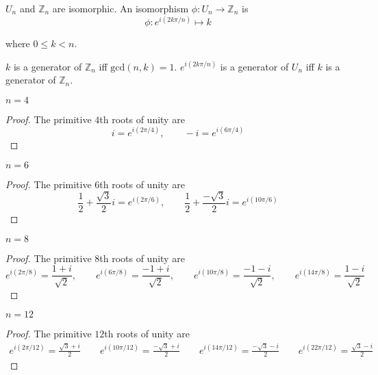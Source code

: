 $U_{n}$ and $\mathbb{Z}_{n}$ are isomorphic. An isomorphism $\phi: U_{n} \to \mathbb{Z}_{n}$ is
\[
    \phi: e^{i(2k\pi/n)} \mapsto k
\]

where $0\leq k < n$.

$k$ is a generator of $\mathbb{Z}_{n}$ iff $\text{gcd}(n, k) = 1$. $e^{i(2k\pi/n)}$ is a generator of $U_{n}$ iff $k$ is a generator of $\mathbb{Z}_{n}$.

\begin{exercise}
    $n = 4$
\end{exercise}

\begin{proof}
    The primitive $4$th roots of unity are
    \[
        i = e^{i(2\pi/4)},\qquad -i = e^{i(6\pi/4)}
    \]
\end{proof}

\begin{exercise}
    $n = 6$
\end{exercise}

\begin{proof}
    The primitive $6$th roots of unity are
    \[
        \frac{1}{2} + \frac{\sqrt{3}}{2}i = e^{i(2\pi/6)},\qquad \frac{1}{2} + \frac{-\sqrt{3}}{2}i = e^{i(10\pi/6)}
    \]
\end{proof}

\begin{exercise}
    $n = 8$
\end{exercise}

\begin{proof}
    The primitive $8$th roots of unity are
    \[
        e^{i(2\pi/8)} = \frac{1 + i}{\sqrt{2}},\qquad e^{i(6\pi/8)} = \frac{-1+i}{\sqrt{2}},\qquad e^{i(10\pi/8)} = \frac{-1-i}{\sqrt{2}},\qquad e^{i(14\pi/8)} = \frac{1-i}{\sqrt{2}}
    \]
\end{proof}

\begin{exercise}
    $n = 12$
\end{exercise}

\begin{proof}
    The primitive $12$th roots of unity are
    \[
        \begin{split}
            e^{i(2\pi/12)} = \frac{\sqrt{3} + i}{2} \qquad e^{i(10\pi/12)} = \frac{-\sqrt{3} + i}{2}\qquad e^{i(14\pi/12)} = \frac{-\sqrt{3} - i}{2} \qquad e^{i(22\pi/12)} = \frac{\sqrt{3} - i}{2}
        \end{split}
    \]
\end{proof}

